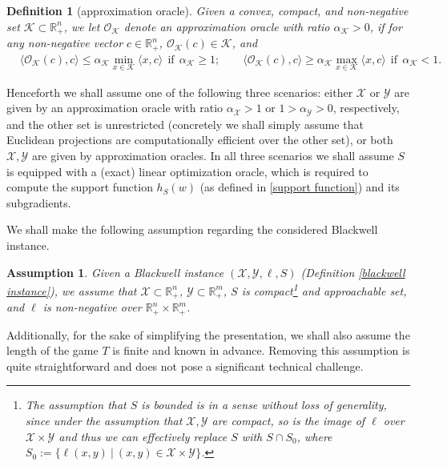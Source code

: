 \documentclass[a4paper,12pt]{article}
\newtheorem{definition} {Definition}
\newtheorem{assumption} {Assumption}
\newtheorem{remark} {Remark}
\newcommand{\mY}{\mathcal{Y}}
\newcommand{\mX}{\mathcal{X}}
\newcommand{\mK}{\mathcal{K}}
\newcommand{\reals}{\mathbb{R}}
\begin{document}
\begin{definition}[approximation oracle] 
\label{def:app oracle}
Given a convex, compact, and non-negative set $\mK\subset\reals^n_{+}$, we let $\mathcal{O}_{\mK}$ denote an approximation oracle with ratio $\alpha_{\mK} > 0$, if for any non-negative vector $c\in\reals^n_+$, $\mathcal{O}_{\mK}(c)\in \mK$, and
\begin{align*}
&  \langle{\mathcal{O}_{\mK}(c), c}\rangle \leq \alpha_{\mK}\min_{x\in\mK} \langle{x,c}\rangle  ~~ \textrm {if} ~~ \alpha_{\mK} \geq 1;   \qquad \langle{\mathcal{O}_{\mK}(c), c}\rangle \geq \alpha_{\mK}\max_{x\in\mK} \langle{x,c}\rangle  ~~ \textrm {if} ~~ \alpha_{\mK} < 1. 
\end{align*} 
\end{definition} 
Henceforth we shall assume one of the following three scenarios: either $\mX$ or $\mY$ are given by an approximation oracle with ratio $\alpha_{\mX} >1$ or $1 > \alpha_{\mY} > 0$, respectively, and the other set is unrestricted (concretely we shall simply assume that Euclidean projections are computationally efficient over the other set), or both $\mX,\mY$ are given by approximation oracles. In all three scenarios we shall assume $S$ is equipped with a (exact) linear optimization oracle, which is required to compute the support function $h_S(w)$ (as defined in \eqref{support function}) and its subgradients.

We shall make the following assumption regarding the considered Blackwell instance.
\begin{assumption}\label{ass:1}
Given a Blackwell instance $(\mX,\mY,\ell,S)$ (Definition \ref{blackwell instance}), we assume  that $\mX\subset\reals^n_+$, $\mY\subset\reals^m_+$, $S$ is compact\footnote{The assumption that $S$ is bounded is in a sense without loss of generality, since under the assumption that $\mX,\mY$ are compact, so is the image of $\ell$ over $\mX\times\mY$ and thus we can  effectively replace $S$ with $S\cap{}S_0$, where $S_0 := \{\ell(x,y) ~|~(x,y)\in\mX\times\mY\}$.} and approachable set, and $\ell$ is non-negative over $\reals^n_+\times\reals^m_+$. 
\end{assumption}

Additionally, for the sake of simplifying the presentation, we shall also assume the length of the game $T$ is finite and known in advance. Removing this assumption is quite straightforward and does not pose a significant  technical challenge.

\end{document}
